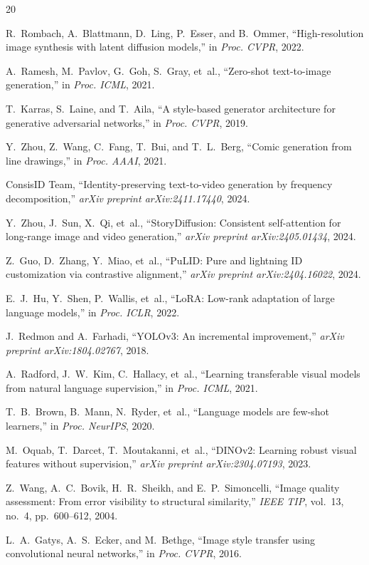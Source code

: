 \documentclass[11pt,a4paper,twocolumn]{article}
\begin{document}
\begin{thebibliography}{20}

R.~Rombach, A.~Blattmann, D.~Ling, P.~Esser, and B.~Ommer, ``High-resolution image synthesis with latent diffusion models,'' in \textit{Proc. CVPR}, 2022.

A.~Ramesh, M.~Pavlov, G.~Goh, S.~Gray, et~al., ``Zero-shot text-to-image generation,'' in \textit{Proc. ICML}, 2021.

T.~Karras, S.~Laine, and T.~Aila, ``A style-based generator architecture for generative adversarial networks,'' in \textit{Proc. CVPR}, 2019.

Y.~Zhou, Z.~Wang, C.~Fang, T.~Bui, and T.~L.~Berg, ``Comic generation from line drawings,'' in \textit{Proc. AAAI}, 2021.

ConsisID Team, ``Identity-preserving text-to-video generation by frequency decomposition,'' \textit{arXiv preprint arXiv:2411.17440}, 2024.

Y.~Zhou, J.~Sun, X.~Qi, et~al., ``StoryDiffusion: Consistent self-attention for long-range image and video generation,'' \textit{arXiv preprint arXiv:2405.01434}, 2024.

Z.~Guo, D.~Zhang, Y.~Miao, et~al., ``PuLID: Pure and lightning ID customization via contrastive alignment,'' \textit{arXiv preprint arXiv:2404.16022}, 2024.

E.~J.~Hu, Y.~Shen, P.~Wallis, et~al., ``LoRA: Low-rank adaptation of large language models,'' in \textit{Proc. ICLR}, 2022.

J.~Redmon and A.~Farhadi, ``YOLOv3: An incremental improvement,'' \textit{arXiv preprint arXiv:1804.02767}, 2018.

A.~Radford, J.~W.~Kim, C.~Hallacy, et~al., ``Learning transferable visual models from natural language supervision,'' in \textit{Proc. ICML}, 2021.

T.~B.~Brown, B.~Mann, N.~Ryder, et~al., ``Language models are few-shot learners,'' in \textit{Proc. NeurIPS}, 2020.

M.~Oquab, T.~Darcet, T.~Moutakanni, et~al., ``DINOv2: Learning robust visual features without supervision,'' \textit{arXiv preprint arXiv:2304.07193}, 2023.

Z.~Wang, A.~C.~Bovik, H.~R.~Sheikh, and E.~P.~Simoncelli, ``Image quality assessment: From error visibility to structural similarity,'' \textit{IEEE TIP}, vol.~13, no.~4, pp.~600--612, 2004.

L.~A.~Gatys, A.~S.~Ecker, and M.~Bethge, ``Image style transfer using convolutional neural networks,'' in \textit{Proc. CVPR}, 2016.

\end{thebibliography}
\end{document}
